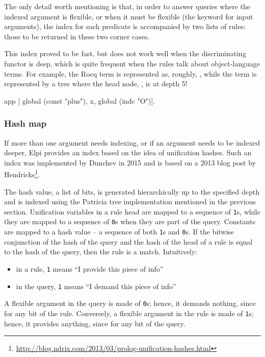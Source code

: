 \documentclass[a4paper, 11pt]{book}
\begin{document}
The only detail worth mentioning is that, in order to answer queries where the
indexed argument is flexible, or when it must be flexible (the 
keyword for input arguments), the index for each predicate is accompanied by
two lists of rules: those to be returned in these two corner cases.


This index proved to be fast, but does not work well when the discriminating
functor is deep, which is quite frequent when the rules talk about object-language
terms. For example, the Rocq term  is represented as, roughly,
, while the term  is represented by a
tree where the head node, , is at depth 5!

\begin{elpicode}
  app [ global (const "plus"), x, global (indc "O")].
\end{elpicode}

\subsubsection{Hash map}


If more than one argument needs indexing, or if an argument needs to be
indexed deeper, Elpi provides an index based on the idea of unification
hashes. Such an index was implemented by Dunchev in 2015 and is based on a
2013 blog post by
Hendricks\footnote{\url{http://blog.ndrix.com/2013/03/prolog-unification-hashes.html}}.


The hash value, a list of bits, is generated hierarchically up to the specified
depth and is indexed using the Patricia tree implementation mentioned in the
previous section. Unification variables in a rule head are mapped to a
sequence of \texttt{1}s, while they are mapped to a sequence of \texttt{0}s
when they are part of the query. Constants are mapped to a hash value -- a
sequence of both \texttt{1}s and \texttt{0}s. If the bitwise conjunction
\ocaml{&} of the hash of the query and the hash of the head of a rule is equal
to the hash of the query, then the rule is a match. Intuitively:
\begin{itemize}
  \item in a rule, \texttt{1} means ``I provide this piece of info''
  \item in the query, \texttt{1} means ``I demand this piece of info''
\end{itemize}


\noindent
A flexible argument in the query is made of \texttt{0}s; hence, it demands
nothing, since  for any bit  of the rule.
Conversely, a flexible argument in the rule is made of \texttt{1}s; hence, it
provides anything, since  for any bit  of the query.
\end{document}
